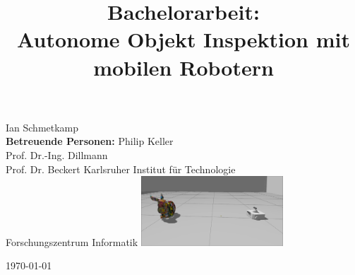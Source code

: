 \documentclass[aspectratio=169]{beamer}
\date{}
\title{\textbf{Bachelorarbeit:} \\ Autonome Objekt Inspektion mit mobilen Robotern }
\begin{document}
\begin{frame}
	\centering
	\maketitle
	\vspace{-2cm}
	Ian Schmetkamp\footnotemark[1] \\ \textbf{Betreuende Personen:} Philip Keller\footnotemark[2] \\ Prof. Dr.-Ing. Dillmann\footnotemark[2] \\ Prof. Dr. Beckert\footnotemark[1]
	\vfill
	\footnotesize{ \footnotemark[1]Karlsruher Institut für Technologie \\  \footnotemark[2]Forschungszentrum Informatik}
	\vfill
	\includegraphics[width=0.4\textwidth]{Graphics/tbandbunny.png}

	\today
\end{frame}
\end{document}
